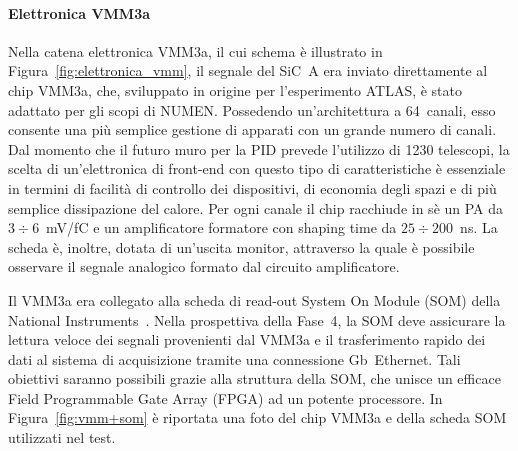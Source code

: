 \paragraph{Elettronica VMM3a} 
%
Nella catena elettronica VMM3a, il cui schema è illustrato in Figura~\ref{fig:elettronica_vmm}, il segnale del SiC~A era inviato direttamente al chip VMM3a, che, sviluppato in origine per l'esperimento ATLAS, è stato adattato per gli scopi di NUMEN.
Possedendo un'architettura a 64~canali, esso consente una più semplice gestione di apparati con un grande numero di canali.
%
%
Dal momento che il futuro muro per la PID prevede l'utilizzo di 1230 telescopi, la scelta di un'elettronica di front-end con questo tipo di caratteristiche è essenziale in termini di facilità di controllo dei dispositivi, di economia degli spazi e di più semplice dissipazione del calore.
Per ogni canale il chip racchiude in sè un PA da $3 \div 6$~mV/fC e un amplificatore formatore con shaping time da $25 \div 200$~ns.
La scheda è, inoltre, dotata di un'uscita monitor, attraverso la quale è possibile osservare il segnale analogico formato dal circuito amplificatore.

Il VMM3a era collegato alla scheda di read-out System On Module (SOM) della National Instruments~\cite{national_instruments}.
Nella prospettiva della Fase~4, la SOM deve assicurare la lettura veloce dei segnali provenienti dal VMM3a e il trasferimento rapido dei dati al sistema di acquisizione tramite una connessione Gb~Ethernet.
Tali obiettivi saranno possibili grazie alla struttura della SOM, che unisce un efficace Field Programmable Gate Array (FPGA) ad un potente processore.
In Figura~\ref{fig:vmm+som} è riportata una foto del chip VMM3a e della scheda SOM utilizzati nel test.

